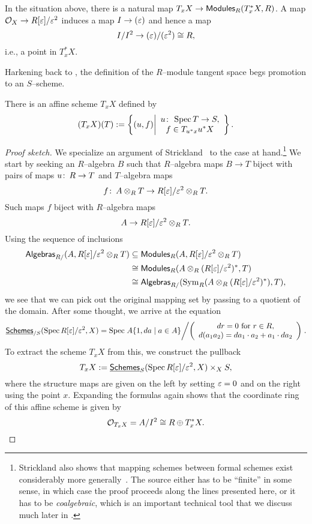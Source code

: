 \begin{remark}
In the situation above, there is a natural map $T_x X \to \mathsf{Modules}_R(T^*_x X, R)$.  A map $\mathcal{O}_X \to R[\varepsilon] / \varepsilon^2$ induces a map $I \to (\varepsilon)$ and hence a map \[I / I^2 \to (\varepsilon) / (\varepsilon^2) \cong R,\] i.e., a point in $T^*_x X$.
\end{remark}

Harkening back to , the definition of the $R$--module tangent space begs promotion to an $S$--scheme.
\begin{lemma}\label{ConstructionTangentAffineScheme}
There is an affine scheme $T_x X$ defined by \[(T_x X)(T) := \left\{ (u, f) \middle| \begin{array}{c} u\colon\thinspace \operatorname{Spec} T \to S, \\ f \in T_{u^* x} u^* X \end{array} \right\}.\]
\end{lemma}
\begin{proof}[Proof sketch]
We specialize an argument of Strickland~\cite[Proposition 2.94]{StricklandFSFG} to the case at hand.\footnote{Strickland also shows that mapping schemes between formal schemes exist considerably more generally~\cite[Theorem 4.69]{StricklandFSFG}.  The source either has to be ``finite'' in some sense, in which case the proof proceeds along the lines presented here, or it has to be \textit{coalgebraic}, which is an important technical tool that we discuss much later in .}  We start by seeking an $R$--algebra $B$ such that $R$--algebra maps $B \to T$ biject with pairs of maps $u\colon\thinspace R \to T$ and $T$--algebra maps \[f\colon\thinspace A \otimes_R T \to R[\varepsilon] / \varepsilon^2 \otimes_R T.\]  Such maps $f$ biject with $R$--algebra maps \[A \to R[\varepsilon] / \varepsilon^2 \otimes_R T.\]  Using the sequence of inclusions
\begin{align*}
\mathsf{Algebras}_{R/}(A, R[\varepsilon] / \varepsilon^2 \otimes_R T) & \subseteq \mathsf{Modules}_R(A, R[\varepsilon] / \varepsilon^2 \otimes_R T) \\
& \cong \mathsf{Modules}_R(A \otimes_R (R[\varepsilon] / \varepsilon^2)^*, T) \\
& \cong \mathsf{Algebras}_{R/}(\operatorname{Sym}_R(A \otimes_R (R[\varepsilon] / \varepsilon^2)^*), T),
\end{align*}
we see that we can pick out the original mapping set by passing to a quotient of the domain.  After some thought, we arrive at the equation \[\operatorname{\underline{\smash{\mathsf{Schemes}}}}_{/S}(\operatorname{Spec} R[\varepsilon] / \varepsilon^2, X) = \operatorname{Spec} \left. A\{1, da \mid a \in A\} \middle/ \left( \begin{array}{c} \text{$dr = 0$ for $r \in R$}, \\ d(a_1 a_2) = da_1 \cdot a_2 + a_1 \cdot da_2 \end{array} \right) \right. .\]  To extract the scheme $T_x X$ from this, we construct the pullback \[T_x X := \operatorname{\underline{\smash{\mathsf{Schemes}}}}_S(\operatorname{Spec} R[\varepsilon] / \varepsilon^2, X) \times_X S,\] where the structure maps are given on the left by setting $\varepsilon = 0$ and on the right using the point $x$.  Expanding the formulas again shows that the coordinate ring of this affine scheme is given by \[\mathcal{O}_{T_x X} = A / I^2 \cong R \oplus T^*_x X. \qedhere\]
\end{proof}

